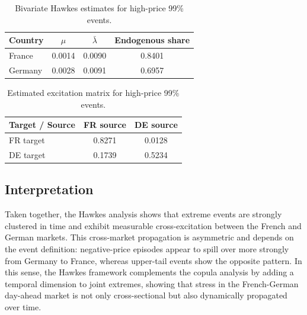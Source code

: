 \begin{table}[H]
\centering
\caption{Bivariate Hawkes estimates for high-price 99\% events.}
\label{tab:hawkes_bi_high}
\begin{tabular}{lccc}
\toprule
Country & \(\mu\) & \(\bar{\lambda}\) & Endogenous share \\
\midrule
France  & 0.0014 & 0.0090 & 0.8401 \\
Germany & 0.0028 & 0.0091 & 0.6957 \\
\bottomrule
\end{tabular}
\end{table}

\begin{table}[H]
\centering
\caption{Estimated excitation matrix for high-price 99\% events.}
\label{tab:hawkes_high_matrix}
\begin{tabular}{lcc}
\toprule
Target / Source & FR source & DE source \\
\midrule
FR target & 0.8271 & 0.0128 \\
DE target & 0.1739 & 0.5234 \\
\bottomrule
\end{tabular}
\end{table}

\subsection{Interpretation}

Taken together, the Hawkes analysis shows that extreme events are strongly clustered in time and exhibit measurable cross-excitation between the French and German markets. This cross-market propagation is asymmetric and depends on the event definition: negative-price episodes appear to spill over more strongly from Germany to France, whereas upper-tail events show the opposite pattern. In this sense, the Hawkes framework complements the copula analysis by adding a temporal dimension to joint extremes, showing that stress in the French-German day-ahead market is not only cross-sectional but also dynamically propagated over time.
